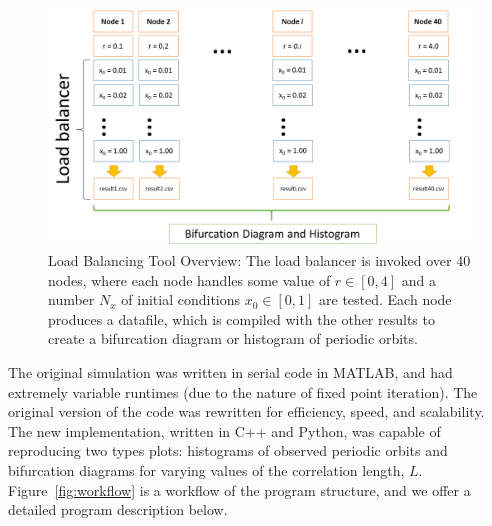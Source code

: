 \begin{figure}[htp]
\caption[Load balancing tool overview]{Load Balancing Tool Overview:
  The load balancer is invoked over 40 nodes, where each node handles
  some value of $r \in [0,4]$ and a number $N_x$ of initial conditions
  $x_0 \in [0,1]$ are tested. Each node produces a datafile, which is
  compiled with the other results to create a bifurcation diagram or
  histogram of periodic orbits.}\label{fig:lbtool}
	\begin{center}
          \includegraphics[scale=0.45]{figs/load_balancer.png}
	\end{center}
\end{figure}

The original simulation was written in serial code in
MATLAB, and had extremely variable runtimes (due to the nature of fixed
point iteration). The original version of the code was rewritten for efficiency,
speed, and scalability. The new implementation, written in C++ and
Python, was capable of reproducing two types plots: histograms of observed periodic
orbits and bifurcation diagrams for varying values of the correlation
length, $L$. Figure~\ref{fig:workflow} is a workflow of the
program structure, and we offer a detailed program description below.

